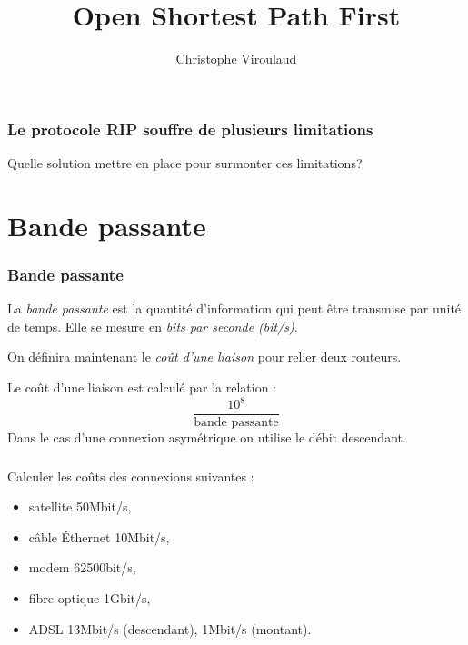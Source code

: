 \documentclass[svgnames,11pt]{beamer}
\author[]{Christophe Viroulaud}
\title{Open Shortest Path First}
\date{\framebox{\textbf{Archi 13}}}
\institute{Terminale - NSI}
\begin{document}
\begin{frame}
    \titlepage
\end{frame}

\begin{frame}
    \frametitle{Le protocole RIP souffre de plusieurs limitations}

    \begin{framed}
        \centering Quelle solution mettre en place pour surmonter ces limitations?
    \end{framed}

\end{frame}

\section{Bande passante}

\begin{frame}
    \frametitle{Bande passante}

    \begin{aretenir}[]
        La \emph{bande passante} est la quantité d'information qui peut être transmise par unité de temps. Elle se mesure en \emph{bits par seconde (bit/s)}.
    \end{aretenir}

\end{frame}

\begin{frame}
    On définira maintenant le \emph{coût d'une liaison} pour relier deux routeurs.

    \begin{aretenir}[]
        Le coût d'une liaison est calculé par la relation :
        $$\dfrac{10^8}{\mbox{bande passante}}$$
        Dans le cas d'une connexion asymétrique on utilise le débit descendant.
    \end{aretenir}
\end{frame}


\begin{frame}
    \frametitle{}

    \begin{activite}
        Calculer les coûts des connexions suivantes :
        \begin{itemize}
            \item satellite 50Mbit/s,
            \item câble Éthernet 10Mbit/s,
            \item modem 62500bit/s,
            \item fibre optique 1Gbit/s,
            \item ADSL 13Mbit/s (descendant), 1Mbit/s (montant).
        \end{itemize}
    \end{activite}

\end{frame}
\end{document}
